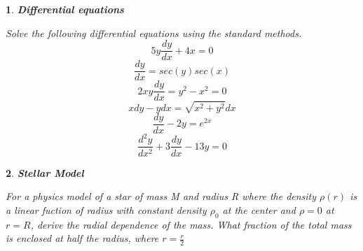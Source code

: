 \documentclass{article}
\newtheorem{p}{}[section]
\begin{document}
	\begin{p}
		\textbf{Differential equations}

		\noindent
		Solve the following differential equations using the standard methods.
		\begin{equation}
			5y\frac{dy}{dx} +4x =0
		\end{equation}
		\begin{equation}
			\frac{dy}{dx}= sec(y)sec(x)
		\end{equation}
		\begin{equation}
			2xy\frac{dy}{dx} =y^{2}-x^{2} =0
		\end{equation}
		\begin{equation}
			xdy-ydx=\sqrt{x^{2}+y^{2}} dx
		\end{equation}
		\begin{equation}
			\frac{dy}{dx} -2y =e^{2x}
		\end{equation}
		\begin{equation}
			\frac{d^2y}{dx^2} +3\frac{dy}{dx} - 13y =0
		\end{equation}

	\end{p}

	\begin{p}
		\textbf{Stellar Model}

		\noindent
		For a physics model of a star of mass M and radius R where the density $\rho(r)$ is a linear fuction of radius with constant density $\rho_{0}$ at the center and $\rho=0$ at $r=R$, derive the radial dependence of the mass. What fraction of the total mass is enclosed at half the radius, where $r=\frac{r}{2}$
	\end{p}
\end{document}
